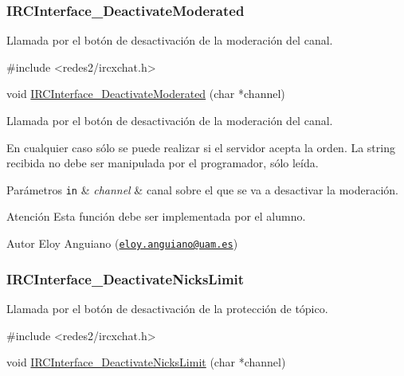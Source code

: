  \hypertarget{IRCInterface_DeactivateModerated}{}\subsubsection{I\+R\+C\+Interface\+\_\+\+Deactivate\+Moderated}\label{IRCInterface_DeactivateModerated}
Llamada por el botón de desactivación de la moderación del canal.


\begin{DoxyCode}
\textcolor{preprocessor}{#include <redes2/ircxchat.h>}

\textcolor{keywordtype}{void} \hyperlink{G-2313-06-P2__client_8c_ab760e8144b38f6c14bd809d157cee5d4}{IRCInterface\_DeactivateModerated} (\textcolor{keywordtype}{char} *channel)
\end{DoxyCode}


Llamada por el botón de desactivación de la moderación del canal.

En cualquier caso sólo se puede realizar si el servidor acepta la orden. La string recibida no debe ser manipulada por el programador, sólo leída.


\begin{DoxyParams}[1]{Parámetros}
\mbox{\tt in}  & {\em channel} & canal sobre el que se va a desactivar la moderación.\\
\hline
\end{DoxyParams}
\begin{DoxyWarning}{Atención}
Esta función debe ser implementada por el alumno.
\end{DoxyWarning}
\begin{DoxyAuthor}{Autor}
Eloy Anguiano (\href{mailto:eloy.anguiano@uam.es}{\tt eloy.\+anguiano@uam.\+es})
\end{DoxyAuthor}


 \hypertarget{IRCInterface_DeactivateNicksLimit}{}\subsubsection{I\+R\+C\+Interface\+\_\+\+Deactivate\+Nicks\+Limit}\label{IRCInterface_DeactivateNicksLimit}
Llamada por el botón de desactivación de la protección de tópico.


\begin{DoxyCode}
\textcolor{preprocessor}{#include <redes2/ircxchat.h>}

\textcolor{keywordtype}{void} \hyperlink{G-2313-06-P2__client_8c_a92c8cfbe2e14e19277e1c97d11719e80}{IRCInterface\_DeactivateNicksLimit} (\textcolor{keywordtype}{char} *channel)
\end{DoxyCode}


